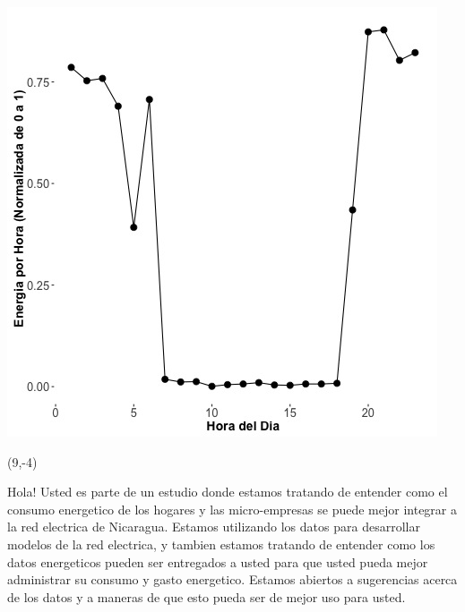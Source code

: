 \documentclass{article}\usepackage[]{graphicx}\usepackage[]{color}
\newenvironment{knitrout}{}{} %
\begin{document}
\begin{knitrout}
\color{fgcolor}
\includegraphics[scale=0.75]{figure/A12_fplot_norm_median} 
\end{knitrout}

 \begin{textblock}{1}(9,-4)
\begin{minipage}{20em}
\begingroup

\endgroup
\end{minipage}
\end{textblock}


\vspace{70px}
\begin{knitrout}
Hola! Usted es parte de un estudio donde estamos tratando de entender como el consumo energetico de los hogares y las micro-empresas se puede mejor integrar a la red electrica de Nicaragua. Estamos utilizando los datos para desarrollar modelos de la red electrica, y tambien estamos tratando de entender como los datos energeticos pueden ser entregados a usted para que usted pueda mejor administrar su consumo y gasto energetico.  Estamos abiertos a sugerencias acerca de los datos y a maneras de que esto pueda ser de mejor uso para usted.
\end{knitrout}
\end{document}
